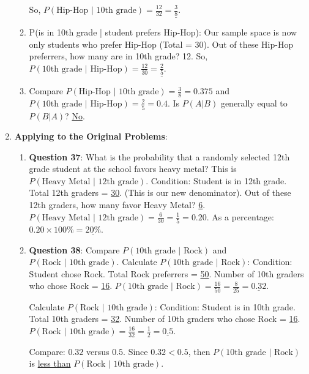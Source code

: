 \documentclass[12pt]{article}
\begin{document}
\begin{enumerate}[label=37-38.\arabic*]
\begin{enumerate}[label=\alph*)]
        So, \( P(\text{Hip-Hop } | \text{ 10th grade}) = \frac{12}{32} = \underline{\frac{3}{8}} \).
        \item P(is in 10th grade | student prefers Hip-Hop):
        Our sample space is now only students who prefer Hip-Hop (Total = 30).
        Out of these Hip-Hop preferrers, how many are in 10th grade? 12.
        So, \( P(\text{10th grade } | \text{ Hip-Hop}) = \frac{12}{30} = \underline{\frac{2}{5}} \).
        \item Compare \( P(\text{Hip-Hop } | \text{ 10th grade}) = \frac{3}{8} = 0.375 \) and \( P(\text{10th grade } | \text{ Hip-Hop}) = \frac{2}{5} = 0.4 \).
        Is \(P(A|B)\) generally equal to \(P(B|A)\)? \underline{No}.
    \end{enumerate}
    \item \textbf{Applying to the Original Problems}:
    \begin{enumerate}[label=\alph*)]
        \item \textbf{Question 37}: What is the probability that a randomly selected 12th grade student at the school favors heavy metal? This is \( P(\text{Heavy Metal } | \text{ 12th grade}) \).
        Condition: Student is in 12th grade. Total 12th graders = \underline{30}. (This is our new denominator).
        Out of these 12th graders, how many favor Heavy Metal? \underline{6}.
        \( P(\text{Heavy Metal } | \text{ 12th grade}) = \frac{6}{30} = \frac{1}{5} = 0.20 \).
        As a percentage: \( 0.20 \times 100\% = \underline{20\%} \).
        \item \textbf{Question 38}: Compare \(P(\text{10th grade } | \text{ Rock})\) and \(P(\text{Rock } | \text{ 10th grade})\).
        Calculate \(P(\text{10th grade } | \text{ Rock})\):
        Condition: Student chose Rock. Total Rock preferrers = \underline{50}.
        Number of 10th graders who chose Rock = \underline{16}.
        \(P(\text{10th grade } | \text{ Rock}) = \frac{16}{50} = \frac{8}{25} = \underline{0.32}\).

        Calculate \(P(\text{Rock } | \text{ 10th grade})\):
        Condition: Student is in 10th grade. Total 10th graders = \underline{32}.
        Number of 10th graders who chose Rock = \underline{16}.
        \(P(\text{Rock } | \text{ 10th grade}) = \frac{16}{32} = \frac{1}{2} = \underline{0.5}\).

        Compare: \(0.32\) versus \(0.5\).
        Since \(0.32 < 0.5\), then \(P(\text{10th grade } | \text{ Rock})\) is \underline{less than} \(P(\text{Rock } | \text{ 10th grade})\).
    \end{enumerate}
\end{enumerate}
\end{document}
